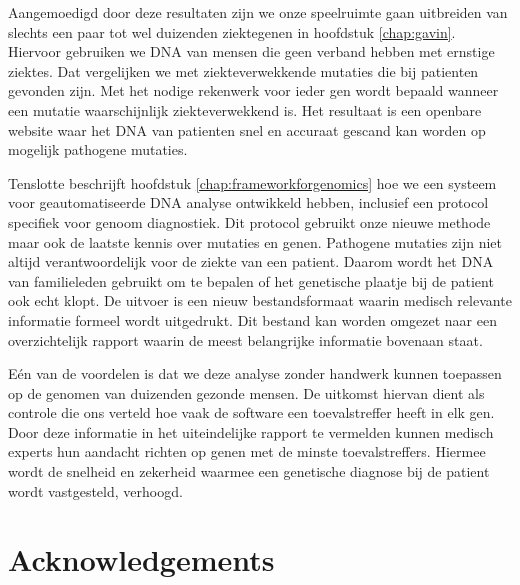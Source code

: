 \begin{appendices}
Aangemoedigd door deze resultaten zijn we onze speelruimte gaan uitbreiden van slechts een paar tot wel duizenden ziektegenen in hoofdstuk \ref{chap:gavin}.
Hiervoor gebruiken we DNA van mensen die geen verband hebben met ernstige ziektes.
Dat vergelijken we met ziekteverwekkende mutaties die bij patienten gevonden zijn.
Met het nodige rekenwerk voor ieder gen wordt bepaald wanneer een mutatie waarschijnlijk ziekteverwekkend is.
Het resultaat is een openbare website waar het DNA van patienten snel en accuraat gescand kan worden op mogelijk pathogene mutaties.

Tenslotte beschrijft hoofdstuk \ref{chap:frameworkforgenomics} hoe we een systeem voor geautomatiseerde DNA analyse ontwikkeld hebben, inclusief een protocol specifiek voor genoom diagnostiek.
Dit protocol gebruikt onze nieuwe methode maar ook de laatste kennis over mutaties en genen.
Pathogene mutaties zijn niet altijd verantwoordelijk voor de ziekte van een patient.
Daarom wordt het DNA van familieleden gebruikt om te bepalen of het genetische plaatje bij de patient ook echt klopt.
De uitvoer is een nieuw bestandsformaat waarin medisch relevante informatie formeel wordt uitgedrukt.
Dit bestand kan worden omgezet naar een overzichtelijk rapport waarin de meest belangrijke informatie bovenaan staat.

Eén van de voordelen is dat we deze analyse zonder handwerk kunnen toepassen op de genomen van duizenden gezonde mensen.
De uitkomst hiervan dient als controle die ons verteld hoe vaak de software een toevalstreffer heeft in elk gen.
Door deze informatie in het uiteindelijke rapport te vermelden kunnen medisch experts hun aandacht richten op genen met de minste toevalstreffers.
Hiermee wordt de snelheid en zekerheid waarmee een genetische diagnose bij de patient wordt vastgesteld, verhoogd.

\chapter{Acknowledgements}

\newpage
~\\~\\~\\~\\~\\


\end{appendices}
